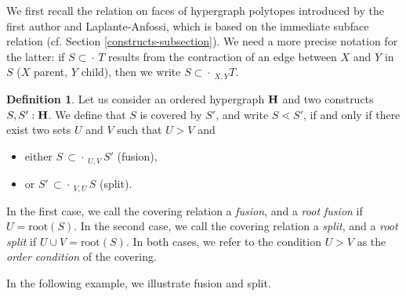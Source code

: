 \documentclass{article}
\theoremstyle{plain}
\theoremstyle{definition}
\newtheorem{definition}[thm]{Definition}
\newcommand{\hyper}[1]{{\bf #1}}
\newcommand{\subsetdot}{{\subset\!\!\!\!\cdot\,}}
\begin{document}
We first recall the relation on faces of hypergraph polytopes introduced by the first author and Laplante-Anfossi, which is based on the immediate subface relation (cf. Section \ref{constructs-subsection}). We need a more precise notation for the latter: if $S \subsetdot T$ results from the contraction of an edge between $X$ and $Y$ in $S$ ($X$ parent, $Y$ child), then we write $S \subsetdot_{X,Y} T$.
\begin{definition}\label{cov}
 Let us consider an ordered hypergraph $\hyper{H}$ and two constructs $S,S':\hyper{H}$. We define that $S$ is covered by $S'$, and write $S \lessdot S'$, if and only if there exist two sets $U$ and $V$ such that $U>V$ and \begin{itemize}
 \item either $S\, \subsetdot_{U,V} \,S'$ (fusion),
 \item or $S' \,\subsetdot_{V,U} \,S$ (split).
 \end{itemize}
 In the first case, we call the covering relation a \emph{fusion}, and a \emph{root fusion} if $U=\text{root}(S)$. 
 In the second case, we call the covering relation a \emph{split}, and a \emph{root split} if $U\cup V=\text{root}(S)$. In both cases, we refer to the condition $U>V$ as the {\em order condition} of the covering. 
\end{definition}

In the following example, we illustrate fusion and split.
\end{document}
